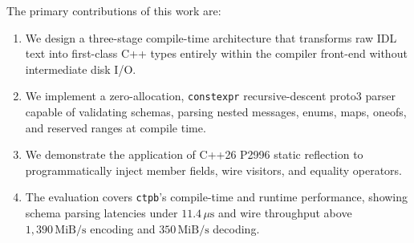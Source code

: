 The primary contributions of this work are:
\begin{enumerate}
    \item We design a three-stage compile-time architecture that transforms raw IDL text into first-class C++ types entirely within the compiler front-end without intermediate disk I/O.
    \item We implement a zero-allocation, \texttt{constexpr} recursive-descent proto3 parser capable of validating schemas, parsing nested messages, enums, maps, oneofs, and reserved ranges at compile time.
    \item We demonstrate the application of C++26 P2996 static reflection to programmatically inject member fields, wire visitors, and equality operators.
    \item The evaluation covers \texttt{ctpb}'s compile-time and runtime performance, showing schema parsing latencies under $11.4\,\mu\text{s}$ and wire throughput above $1{,}390\,\text{MiB/s}$ encoding and $350\,\text{MiB/s}$ decoding.
\end{enumerate}
